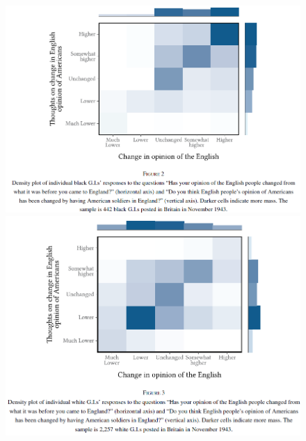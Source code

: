 \documentclass[dvipdfmx,11pt]{beamer}
\begin{document}
\begin{frame}\frametitle{}
  \begin{figure}
    \centering
    \includegraphics[scale = .4]{os1027tanji/F2}
    \includegraphics[scale = .4]{os1027tanji/F3}
  \end{figure}
\end{frame}
\end{document}
